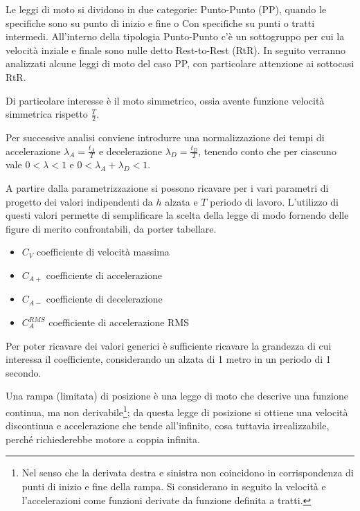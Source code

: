 Le leggi di moto si dividono in due categorie: Punto-Punto (PP), quando le specifiche sono su punto di inizio e fine o Con specifiche su punti o tratti intermedi.
All'interno della tipologia Punto-Punto c'è un sottogruppo per cui la velocità inziale e finale sono nulle detto Rest-to-Rest (RtR).
In seguito verranno analizzati alcune leggi di moto del caso PP, con particolare attenzione ai sottocasi RtR.

Di particolare interesse è il moto simmetrico, ossia avente funzione velocità simmetrica rispetto \(\frac{T}{2}\).

Per successive analisi conviene introdurre una normalizzazione dei tempi di accelerazione \(\lambda_A = \frac{t_A}{T}\) e decelerazione \(\lambda_D = \frac{t_D}{T}\), tenendo conto che per ciascuno vale \(0 < \lambda < 1\) e \(0 < \lambda_A + \lambda_D < 1\).

A partire dalla parametrizzazione si possono ricavare per i vari parametri di progetto dei valori indipendenti da \(h\) alzata e \(T\) periodo di lavoro.
L'utilizzo di questi valori permette di semplificare la scelta della legge di modo fornendo delle figure di merito confrontabili, da porter tabellare.
\begin{itemize}
    \item \(C_V\) coefficiente di velocità massima
    \item \(C_{A+}\) coefficiente di accelerazione
    \item \(C_{A-}\) coefficiente di decelerazione
    \item \(C_A^{RMS}\) coefficiente di accelerazione RMS
\end{itemize}
Per poter ricavare dei valori generici è sufficiente ricavare la grandezza di cui interessa il coefficiente, considerando un alzata di 1 metro in un periodo di 1 secondo.

Una rampa (limitata) di posizione è una legge di moto che descrive una funzione continua, ma non derivabile\footnote{Nel senso che la derivata destra e sinistra non coincidono in corrispondenza di punti di inizio e fine della rampa. Si considerano in seguito la velocità e l'accelerazioni come funzioni derivate da funzione definita a tratti.}; da questa legge di posizione si ottiene una velocità discontinua e accelerazione che tende all'infinito, cosa tuttavia irrealizzabile, perché richiederebbe motore a coppia infinita.

